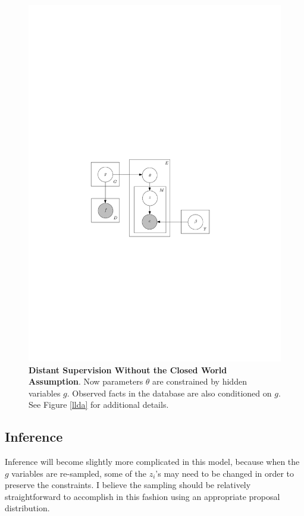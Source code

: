 \documentclass[12pt]{article}
\begin{document}
\begin{figure}
  \centering
  \includegraphics{glda.pdf}
  \caption{{\bf Distant Supervision Without the Closed World Assumption}.  Now parameters $\theta$ are constrained by hidden variables $g$.  Observed facts in the database
    are also conditioned on $g$.  See Figure \ref{llda} for additional details.}
\end{figure}

\subsection{Inference}
Inference will become slightly more complicated in this model, because when the $g$ variables are re-sampled, some of the $z_i$'s may need to be changed
in order to preserve the constraints.  I believe the sampling should be relatively straightforward to accomplish in this fashion using an appropriate proposal distribution.


\end{document}
